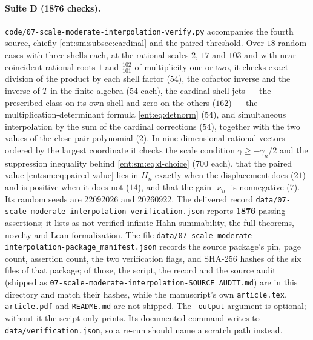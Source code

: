 \documentclass[11pt]{article}
\theoremstyle{plain}
\theoremstyle{plain}
\theoremstyle{plain}
\theoremstyle{definition}
\theoremstyle{definition}
\theoremstyle{definition}
\theoremstyle{definition}
\theoremstyle{remark}
\begin{document}
\paragraph{Suite D (1876 checks).}
\texttt{code/07-scale-moderate-interpolation-verify.py} accompanies the fourth
source, chiefly \cref{ent:sm:subsec:cardinal} and the paired threshold. Over
$18$ random cases with three shells each, at the rational scales $2$, $17$
and $103$ and with near-coincident rational roots $1$ and $\tfrac{102}{101}$
of multiplicity one or two, it checks exact division of the product by each
shell factor ($54$), the cofactor inverse and the inverse of $T$ in the finite
algebra ($54$ each), the cardinal shell jets --- the prescribed class on its
own shell and zero on the others ($162$) --- the multiplication-determinant
formula \eqref{ent:eq:detnorm} ($54$), and simultaneous interpolation by the
sum of the cardinal corrections ($54$), together with the two values of the
close-pair polynomial ($2$). In nine-dimensional rational vectors ordered by
the largest coordinate it checks the scale condition $\gamma\ge-\gamma_n/2$ and
the suppression inequality behind \eqref{ent:sm:eq:d-choice} ($700$ each),
that the paired value \eqref{ent:sm:eq:paired-value} lies in $H_n$ exactly
when the displacement does ($21$) and is positive when it does not ($14$),
and that the gain $\varkappa_n$ is nonnegative ($7$). Its random seeds are
$22092026$ and $20260922$. The delivered record
\texttt{data/07-scale-moderate-interpolation-verification.json} reports
\textbf{1876} passing assertions; it lists as not verified infinite Hahn
summability, the full theorems, novelty and Lean formalization. The file
\texttt{data/07-scale-moderate-interpolation-package\_manifest.json} records
the source package's pin, page count, assertion count, the two verification
flags, and SHA-256 hashes of the six files of that package; of those, the
script, the record and the source audit (shipped as
\texttt{07-scale-moderate-interpolation-SOURCE\_AUDIT.md}) are in this
directory and match their hashes, while the manuscript's own
\texttt{article.tex}, \texttt{article.pdf} and \texttt{README.md} are not
shipped. The \texttt{--output} argument is optional; without it the script
only prints. Its documented command writes to \texttt{data/verification.json},
so a re-run should name a scratch path instead.
\end{document}
